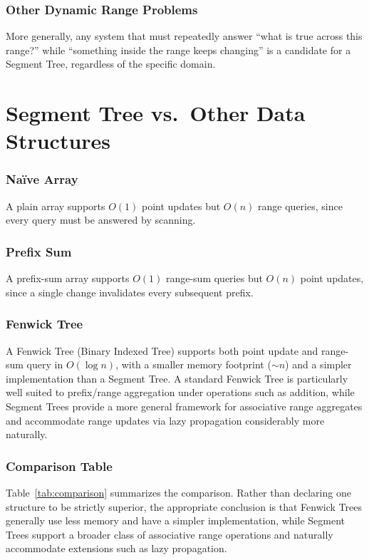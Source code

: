 \documentclass[11pt,open=any]{scrreprt}
\begin{document}
\subsection{Other Dynamic Range Problems}
More generally, any system that must repeatedly answer ``what is true across this range?'' while ``something inside the range keeps changing'' is a candidate for a Segment Tree, regardless of the specific domain.

\chapter{Segment Tree vs.\ Other Data Structures}

\subsection{Na\"ive Array}
A plain array supports $O(1)$ point updates but $O(n)$ range queries, since every query must be answered by scanning.

\subsection{Prefix Sum}
A prefix-sum array supports $O(1)$ range-sum queries but $O(n)$ point updates, since a single change invalidates every subsequent prefix.

\subsection{Fenwick Tree}
A Fenwick Tree (Binary Indexed Tree) supports both point update and range-sum query in $O(\log n)$, with a smaller memory footprint ($\sim n$) and a simpler implementation than a Segment Tree. A standard Fenwick Tree is particularly well suited to prefix/range aggregation under operations such as addition, while Segment Trees provide a more general framework for associative range aggregates and accommodate range updates via lazy propagation considerably more naturally.

\subsection{Comparison Table}
Table~\ref{tab:comparison} summarizes the comparison. Rather than declaring one structure to be strictly superior, the appropriate conclusion is that Fenwick Trees generally use less memory and have a simpler implementation, while Segment Trees support a broader class of associative range operations and naturally accommodate extensions such as lazy propagation.
\end{document}
